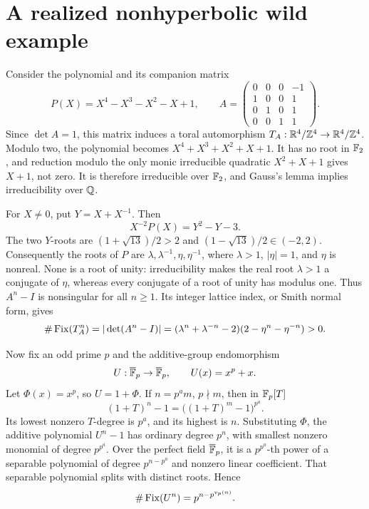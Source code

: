 \section{A realized nonhyperbolic wild example}\label{sec:example}

Consider the polynomial and its companion matrix
\[
P(X)=X^4-X^3-X^2-X+1,\qquad
A=\begin{pmatrix}
0&0&0&-1\\
1&0&0&1\\
0&1&0&1\\
0&0&1&1
\end{pmatrix}.
\]
Since \(\det A=1\), this matrix induces a toral automorphism
\(T_A:\mathbb R^4/\mathbb Z^4\to\mathbb R^4/\mathbb Z^4\).
Modulo two, the polynomial becomes \(X^4+X^3+X^2+X+1\).
It has no root in \(\mathbb F_2\), and reduction modulo the only monic
irreducible quadratic \(X^2+X+1\) gives \(X+1\), not zero.
It is therefore irreducible over \(\mathbb F_2\), and Gauss's lemma implies
irreducibility over \(\mathbb Q\).

For \(X\ne0\), put \(Y=X+X^{-1}\). Then
\[
X^{-2}P(X)=Y^2-Y-3.
\]
The two \(Y\)-roots are
\((1+\sqrt{13})/2>2\) and \((1-\sqrt{13})/2\in(-2,2)\).
Consequently the roots of \(P\) are
\(\lambda,\lambda^{-1},\eta,\eta^{-1}\), where \(\lambda>1\),
\(|\eta|=1\), and \(\eta\) is nonreal. None is a root of unity:
irreducibility makes the real root \(\lambda>1\) a conjugate of
\(\eta\), whereas every conjugate of a root of unity has modulus one.
Thus \(A^n-I\) is nonsingular for all \(n\geq1\). Its integer lattice
index, or Smith normal form, gives
\begin{equation}\label{eq:toral-example}
\#\operatorname{Fix}(T_A^n)=|\det(A^n-I)|
=(\lambda^n+\lambda^{-n}-2)(2-\eta^n-\eta^{-n})>0.
\end{equation}

Now fix an odd prime \(p\) and the additive-group endomorphism
\[
U:\overline{\mathbb F}_p\to\overline{\mathbb F}_p,\qquad U(x)=x^p+x.
\]
Let \(\Phi(x)=x^p\), so \(U=1+\Phi\). If \(n=p^am\), \(p\nmid m\),
then in \(\mathbb F_p[T]\)
\[
(1+T)^n-1=\bigl((1+T)^m-1\bigr)^{p^a}.
\]
Its lowest nonzero \(T\)-degree is \(p^a\), and its highest is \(n\).
Substituting \(\Phi\), the additive polynomial \(U^n-1\) has ordinary
degree \(p^n\), with smallest nonzero monomial of degree \(p^{p^a}\).
Over the perfect field \(\overline{\mathbb F}_p\), it is a
\(p^{p^a}\)-th power of a separable polynomial of degree \(p^{n-p^a}\)
and nonzero linear coefficient. That separable polynomial splits
with distinct roots. Hence
\begin{equation}\label{eq:additive-example}
\#\operatorname{Fix}(U^n)=p^{n-p^{v_p(n)}}.
\end{equation}


